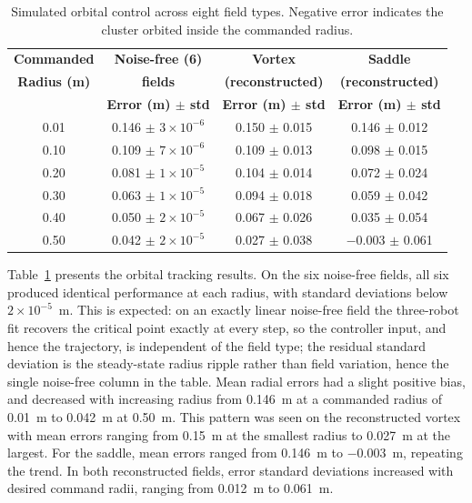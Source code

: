 \documentclass[lettersize,journal]{IEEEtran}
\begin{document}
\begin{table}[!t]
    \centering
    \caption{Simulated orbital control across eight field types. Negative error indicates the cluster orbited inside the commanded radius.}
    \label{tab:simulation_orbital_results}
    \footnotesize
    \setlength{\tabcolsep}{3pt}
    \begin{tabular}{cccc}
    \hline
    \textbf{Commanded} & \textbf{Noise-free (6)} & \textbf{Vortex} & \textbf{Saddle} \\
    \textbf{Radius (m)} & \textbf{fields} & \textbf{(reconstructed)} & \textbf{(reconstructed)} \\
     & \textbf{Error (m) $\pm$ std} & \textbf{Error (m) $\pm$ std} & \textbf{Error (m) $\pm$ std} \\
    \hline
    0.01 & 0.146 $\pm$ $3{\times}10^{-6}$ & 0.150 $\pm$ 0.015 & 0.146 $\pm$ 0.012 \\
    0.10 & 0.109 $\pm$ $7{\times}10^{-6}$ & 0.109 $\pm$ 0.013 & 0.098 $\pm$ 0.015 \\
    0.20 & 0.081 $\pm$ $1{\times}10^{-5}$ & 0.104 $\pm$ 0.014 & 0.072 $\pm$ 0.024 \\
    0.30 & 0.063 $\pm$ $1{\times}10^{-5}$ & 0.094 $\pm$ 0.018 & 0.059 $\pm$ 0.042 \\
    0.40 & 0.050 $\pm$ $2{\times}10^{-5}$ & 0.067 $\pm$ 0.026 & 0.035 $\pm$ 0.054 \\
    0.50 & 0.042 $\pm$ $2{\times}10^{-5}$ & 0.027 $\pm$ 0.038 & $-$0.003 $\pm$ 0.061 \\

    \hline
    \end{tabular}
    \end{table}


    Table~\ref{tab:simulation_orbital_results} presents the orbital tracking results. On the six noise-free fields, all six produced identical performance at each radius, with standard deviations below $2 \times 10^{-5}$~m. This is expected: on an exactly linear noise-free field the three-robot fit recovers the critical point exactly at every step, so the controller input, and hence the trajectory, is independent of the field type; the residual standard deviation is the steady-state radius ripple rather than field variation, hence the single noise-free column in the table. Mean radial errors had a slight positive bias, and decreased with increasing radius from 0.146~m at a commanded radius of 0.01~m to 0.042~m at 0.50~m. This pattern was seen on the reconstructed vortex with mean errors ranging from 0.15~m at the smallest radius to 0.027~m at the largest. For the saddle, mean errors ranged from 0.146~m to $-0.003$~m, repeating the trend. In both reconstructed fields, error standard deviations increased with desired command radii, ranging from 0.012~m to 0.061~m.    
\end{document}
